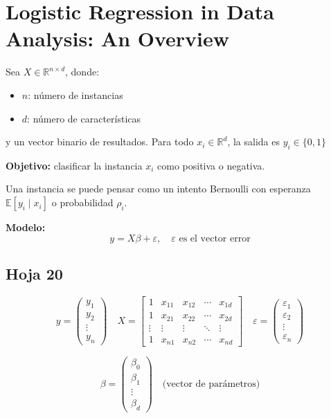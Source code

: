 \documentclass[12pt]{article}
\begin{document}
\section*{Logistic Regression in Data Analysis: An Overview}

Sea \( X \in \mathbb{R}^{n \times d} \), donde:
\begin{itemize}
  \item \( n \): número de instancias
  \item \( d \): número de características
\end{itemize}

\noindent y un vector binario de resultados. Para todo \( x_i \in \mathbb{R}^d \), la salida es \( y_i \in \{0,1\} \)

\medskip

\textbf{Objetivo:} clasificar la instancia \( x_i \) como positiva o negativa.

\medskip

Una instancia se puede pensar como un intento Bernoulli con esperanza \( \mathbb{E}[y_i \mid x_i] \) o probabilidad \( \rho_i \).

\medskip

\textbf{Modelo:}
\[
y = X \beta + \varepsilon, \quad \varepsilon \text{ es el vector error}
\]


\subsection{Hoja 20}
\[
y = 
\begin{pmatrix}
y_1 \\
y_2 \\
\vdots \\
y_n
\end{pmatrix}
\quad
X = 
\begin{bmatrix}
1 & x_{11} & x_{12} & \cdots & x_{1d} \\
1 & x_{21} & x_{22} & \cdots & x_{2d} \\
\vdots & \vdots & \vdots & \ddots & \vdots \\
1 & x_{n1} & x_{n2} & \cdots & x_{nd}
\end{bmatrix}
\quad
\varepsilon = 
\begin{pmatrix}
\varepsilon_1 \\
\varepsilon_2 \\
\vdots \\
\varepsilon_n
\end{pmatrix}
\]

\[
\beta = 
\begin{pmatrix}
\beta_0 \\
\beta_1 \\
\vdots \\
\beta_d
\end{pmatrix}
\quad \text{(vector de parámetros)}
\]
\end{document}

